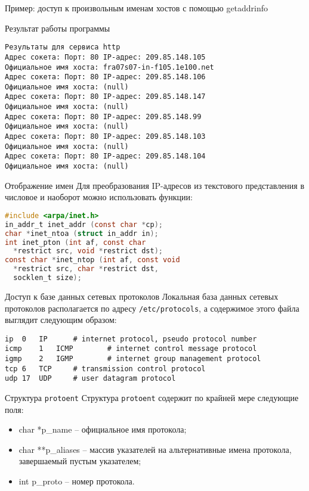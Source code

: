 \begin{frame}[fragile]{Пример: доступ к произвольным именам хостов с помощью getaddrinfo}
\tiny
\end{frame}

\begin{frame}[fragile]{Результат работы программы}
\scriptsize\begin{verbatim}
Результаты для сервиса http
Адрес сокета: Порт: 80 IP-адрес: 209.85.148.105
Официальное имя хоста: fra07s07-in-f105.1e100.net
Адрес сокета: Порт: 80 IP-адрес: 209.85.148.106
Официальное имя хоста: (null)
Адрес сокета: Порт: 80 IP-адрес: 209.85.148.147
Официальное имя хоста: (null)
Адрес сокета: Порт: 80 IP-адрес: 209.85.148.99
Официальное имя хоста: (null)
Адрес сокета: Порт: 80 IP-адрес: 209.85.148.103
Официальное имя хоста: (null)
Адрес сокета: Порт: 80 IP-адрес: 209.85.148.104
Официальное имя хоста: (null)
\end{verbatim}
\end{frame}

\begin{frame}[fragile]{Отображение имен}
Для преобразования IP-адресов из текстового представления в числовое и наоборот можно использовать функции:
\scriptsize\begin{lstlisting}[language=C]
#include <arpa/inet.h>
in_addr_t inet_addr (const char *cp);
char *inet_ntoa (struct in_addr in);
int inet_pton (int af, const char 
  *restrict src, void *restrict dst);
const char *inet_ntop (int af, const void 
  *restrict src, char *restrict dst, 
  socklen_t size);
\end{lstlisting}
\end{frame}

\begin{frame}[fragile]{Доступ к базе данных сетевых протоколов}
Локальная база данных сетевых протоколов располагается по адресу {\tt /etc/protocols}, а содержимое этого файла выглядит следующим образом:
\scriptsize\begin{verbatim}
ip	0	IP		# internet protocol, pseudo protocol number
icmp	1	ICMP		# internet control message protocol
igmp	2	IGMP		# internet group management protocol
tcp	6	TCP		# transmission control protocol
udp	17	UDP		# user datagram protocol
\end{verbatim}
\end{frame}

\begin{frame}[fragile]{Структура {\tt protoent}}
Структура {\tt protoent} содержит по крайней мере следующие поля:
\begin{itemize}
	\item char  *p\_name -- официальное имя протокола;
	\item char **p\_aliases -- массив указателей на альтернативные имена протокола, завершаемый пустым указателем;
	\item int    p\_proto -- номер протокола.
\end{itemize}
\end{frame}

